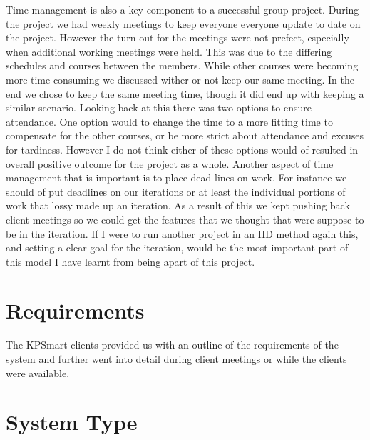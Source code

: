 \documentclass{style/CRPITStyle}
\begin{document}
Time management is also a key component to a successful group project.
During the project we had weekly meetings to keep everyone everyone update to
date on the project. However the turn out for the meetings were not prefect,
especially when additional working meetings were held. This was
due to the differing schedules and courses between the members. While other
courses were becoming more time consuming we discussed wither or not keep our
same meeting. In the end we chose to keep the same meeting time, though it did
end up with keeping a similar scenario. Looking back at this there was two
options to ensure attendance. One option would to change the time to a more
fitting time to compensate for the other courses, or be more strict about
attendance and excuses for tardiness. However I do not think either of these
options would of resulted in overall positive outcome for the project as a
whole. Another aspect of time management that is important is to place dead
lines on work. For instance we should of put deadlines on our iterations or at
least the individual portions of work that lossy made up an iteration. As a
result of this we kept pushing back client meetings so we could get the features
that we thought that were suppose to be in the iteration. If I were to run
another project in an IID method again this, and setting a clear goal for the
iteration, would be the most important part of this model I have learnt from
being apart of this project.

\section{Requirements}

The KPSmart clients provided us with an outline of the requirements of the
system and further went into detail during client meetings or while the clients
were available.


\section{System Type}
\end{document}
